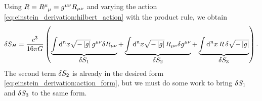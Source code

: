 Using $R = R\indices{^\mu_\mu} = g^{\mu \nu} R_{\mu \nu}$ and varying the action \eqref{eq:einstein_derivation:hilbert_action} with the product rule, we obtain
\begin{equation}
	\delta S_H = \frac{c^3}{16 \pi G} \left(
	                  \underbrace{\int \mathop{}\!\mathrm{d}^n x \sqrt{-\left\lvert g \right\rvert} \, g^{\mu \nu} \delta R_{\mu \nu}}_{\textstyle \delta S_1}
	                + \underbrace{\int \mathop{}\!\mathrm{d}^n x \sqrt{-\left\lvert g \right\rvert} \, R_{\mu \nu} \delta g^{\mu \nu}}_{\textstyle \delta S_2}
	                + \underbrace{\int \mathop{}\!\mathrm{d}^n x \, R \, \delta \sqrt{-\left\lvert g \right\rvert}                      }_{\textstyle \delta S_3}
					\right) .
	\label{eq:einstein_derivation:ds_split}
\end{equation}
The second term $\delta S_2$ is already in the desired form \eqref{eq:einstein_derivation:action_form}, but we must do some work to bring $\delta S_1$ and $\delta S_3$ to the same form.


